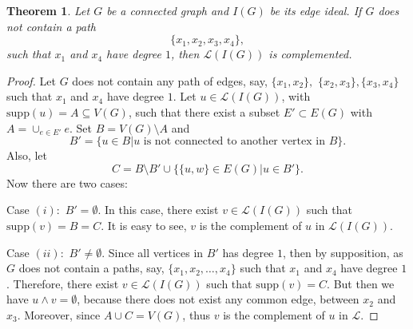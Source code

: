 \documentclass[11pt]{amsart}
\newcommand{\LC}{\mathcal{L}}
\newcommand{\supp}{\mathrm{supp}}
\theoremstyle{plain}
\numberwithin{lemma}{\DefaultNumberTheoremWithin}
\numberwithin{claim}{\DefaultNumberTheoremWithin}
\newtheorem{theorem}{Theorem}
\numberwithin{theorem}{\DefaultNumberTheoremWithin}
\numberwithin{corollary}{\DefaultNumberTheoremWithin}
\numberwithin{proposition}{\DefaultNumberTheoremWithin}
\numberwithin{conjecture}{\DefaultNumberTheoremWithin}
\theoremstyle{definition}
\numberwithin{definition}{\DefaultNumberTheoremWithin}
\theoremstyle{definition}
\numberwithin{question}{\DefaultNumberTheoremWithin}
\theoremstyle{definition}
\numberwithin{problem}{\DefaultNumberTheoremWithin}
\theoremstyle{remark}
\newtheorem{remark}{Remark}
\numberwithin{remark}
     {\DefaultNumberTheoremWithin}
\theoremstyle{remark}
\numberwithin{example}{\DefaultNumberTheoremWithin}
\def\H{\mathcal {H}}
\begin{document}

  
\begin{theorem}
Let $G$ be a connected graph and $I(G)$ be its edge ideal. If $G$ does not contain a path
\[
\{x_1,x_2,x_3,x_4\},
\]
such that $x_1$ and $x_4$ have degree $1$, then $\LC(I(G))$ is complemented.
\end{theorem}\begin{proof}

     Let $G$ does not contain any path of edges, say, $\{x_1,x_2\},$ $\{x_2,x_3\}, \{x_{3},x_4\}$ such that $x_1$ and $x_4$ have degree $1$. Let $u \in \mathcal{L}(I(G))$, with $\supp(u) =A\subseteq V(G)$, such that there exist a subset $E' \subset E(G)$ with $A=\cup_{e\in E'} e.$ Set $B =V(G) \setminus A $ and 
     $$B'=\{u \in B| u \text{ is not connected to another vertex in } B\}.$$ 
     Also, let $$C= B\setminus B' \cup \{\{u,w\}\in E(G) | u\in B'\}.$$
     Now there are two cases:

     Case $(i):$ $B'=\emptyset $. In this case, there exist $v \in \mathcal{L}(I(G))$ such that $\supp(v)=B=C$. It is easy to see, $v$ is the complement of $u$ in $\mathcal{L}(I(G))$.

     Case $(ii):$ $B'\not=\emptyset $. Since all vertices in $B'$ has degree $1$, then by supposition, as $G$ does not contain a paths, say, $\{x_1,x_2, \ldots, x_4\}$ such that $x_1$ and $x_4$ have degree $1$. Therefore, there exist $v \in \mathcal{L}(I(G))$  such that $\supp(v)=C$. But then we have $u \wedge v = \emptyset$, because there does not exist any common edge, between $x_2$ and $x_3$. Moreover, since $A \cup C = V(G)$, thus $v$ is the complement of $u$ in $\mathcal{L}$.
\end{proof}
\end{document}
